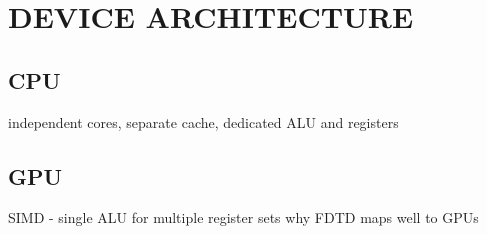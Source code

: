 \chapter{DEVICE ARCHITECTURE} \label{ch:device architecture}

\section{CPU}
independent cores, separate cache, dedicated ALU and registers

\section{GPU}

SIMD - single ALU for multiple register sets
why FDTD maps well to GPUs



